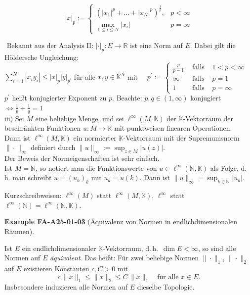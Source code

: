 \documentclass[10pt, letterpaper]{article}
\newcommand{\CustomHeading}[3]{%
  \par\medskip\noindent%
  \textbf{#1 #2} \textnormal{(#3)}.\enskip%
}
\newenvironment{EXA}[2]{\begin{unitbox}\CustomHeading{Example}{#1}{#2}}{\end{unitbox}}
\begin{document}
$$
|x|_{p}:= \begin{cases}\left(\left|x_{1}\right|^{p}+\ldots+\left|x_{N}\right|^{p}\right)^{\frac{1}{p}}, & p<\infty \\ \max _{1 \leq i \leq N}\left|x_{i}\right| & p=\infty\end{cases}
$$

$\underline{\text { Bekannt aus der Analysis II: }}|\cdot|_{p}: E \rightarrow \mathbb{R}$ ist eine Norm auf $E$. Dabei gilt die Höldersche Ungleichung:\\
$\sum_{i=1}^{N}\left|x_{i} y_{i}\right| \leq|x|_{p}|y|_{p^{\prime}}$ für alle $x, y \in \mathbb{K}^{N}$ mit $\quad p^{\prime}:=\left\{\begin{array}{lll}\frac{p}{p-1} & \text { falls } & 1<p<\infty \\ \infty & \text { falls } & p=1 \\ 1 & \text { falls } & p=\infty\end{array}\right.$\\
$p^{\prime}$ heißt konjugierter Exponent zu $p$. Beachte: $p, q \in(1, \infty)$ konjugiert $\Longleftrightarrow \frac{1}{p}+\frac{1}{q}=1$\\
iii) Sei $M$ eine beliebige Menge, und sei $\ell^{\infty}(M, \mathbb{K})$ der $\mathbb{K}$-Vektorraum der beschränkten Funktionen $u: M \rightarrow \mathbb{K}$ mit punktweisen linearen Operationen.\\
Dann ist $\ell^{\infty}(M, \mathbb{K})$ ein normierter $\mathbb{K}$-Vektorraum mit der Supremumsnorm $\|\cdot\|_{\infty}$ definiert durch $\|u\|_{\infty}:=\sup _{z \in M}|u(z)|$.\\
Der Beweis der Normeigenschaften ist sehr einfach.\\
Ist $M=\mathbb{N}$, so notiert man die Funktionswerte von $u \in \ell^{\infty}(\mathbb{N}, \mathbb{K})$ als Folge, d. h. man schreibt $u=\left(u_{k}\right)_{k}$ mit $u_{k}=u(k)$. Dann ist $\|u\|_{\infty}=\sup _{k \in \mathbb{N}}\left|u_{k}\right|$.

Kurzschreibweisen: $\ell^{\infty}(M)$ statt $\ell^{\infty}(M, \mathbb{K})$, $\ell^{\infty}$ statt $\ell^{\infty}(\mathbb{N})=\ell^{\infty}(\mathbb{N}, \mathbb{K})$.







\begin{EXA}{FA-A25-01-03}{Äquivalenz von Normen in endlichdimensionalen Räumen}
Ist $E$ ein endlichdimensionaler $\mathbb{K}$-Vektorraum, d.\,h.\ $\dim E<\infty$, so sind alle Normen auf $E$ \emph{äquivalent}.  
Das heißt: Für zwei beliebige Normen $\|\cdot\|_1$, $\|\cdot\|_2$ auf $E$ existieren Konstanten $c,C>0$ mit
\[
c\,\|x\|_1 \le \|x\|_2 \le C\,\|x\|_1
\quad\text{für alle }x\in E.
\]
Insbesondere induzieren alle Normen auf $E$ dieselbe Topologie.
\end{EXA}
\end{document}
